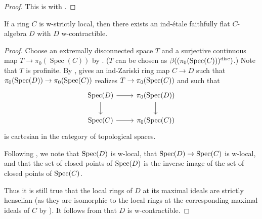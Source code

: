 \begin{proof}
  This is  with .
\end{proof}

\begin{lemma}
  If a ring \(C\) is w-strictly local, then there exists an ind-étale faithfully flat \(C\)-algebra \(D\) with \(D\) w-contractible.
  \label{thm:ind-etale-w-contractible-cover-of-w-strictly-local}
\end{lemma}

\begin{proof}
  Choose an extremally disconnected space $T$ and a surjective continuous map $T \to \pi_0(\operatorname{Spec}(C))$ by . (\(T\) can be chosen as \(\beta((\pi_0(\operatorname{Spec}(C)))^{\textnormal{disc}})\).) Note that $T$ is profinite.
  By ,  gives an ind-Zariski ring map $C \to D$ such that $\pi_0(\operatorname{Spec} (D)) \to \pi_0(\operatorname{Spec} (C))$ realizes $T \to \pi_0(\operatorname{Spec} (C))$ and such that
  \[
  \begin{tikzcd}
  \operatorname{Spec}(D) \arrow[r] \arrow[d] & \pi_0(\operatorname{Spec}(D)) \arrow[d] \\
  \operatorname{Spec}(C) \arrow[r] & \pi_0(\operatorname{Spec}(C))
  \end{tikzcd}
  \]
  is cartesian in the category of topological spaces.

  Following , we note that $\operatorname{Spec} (D)$ is w-local, that $\operatorname{Spec} (D) \to \operatorname{Spec} (C)$ is w-local, and that the set of closed points of $\operatorname{Spec} (D)$ is the inverse image of the set of closed points of $\operatorname{Spec} (C)$.

  Thus it is still true that the local rings of $D$ at its maximal ideals are strictly henselian (as they are isomorphic to the local rings at the corresponding maximal ideals of $C$ by ). It follows from  that $D$ is w-contractible.
\end{proof}


